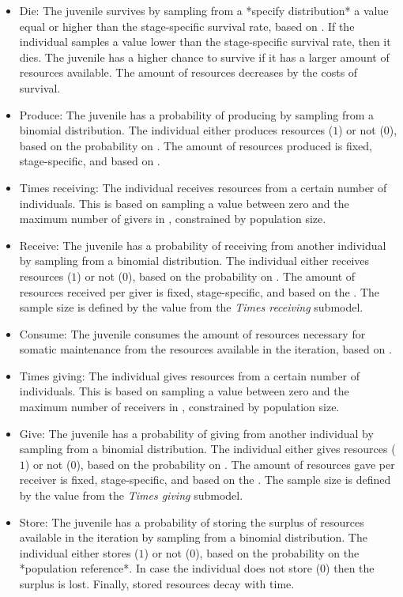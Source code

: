 \documentclass{article}
\begin{document}
\begin{itemize}
    \item Die: The juvenile survives by sampling from a *specify distribution* a value equal or higher than the stage-specific survival rate, based on \cite{gurven2007longevity}. If the individual samples a value lower than the stage-specific survival rate, then it dies. The juvenile has a higher chance to survive if it has a larger amount of resources available. The amount of resources decreases by the costs of survival.
    \item Produce: The juvenile has a probability of producing by sampling from a binomial distribution. The individual either produces resources ($1$) or not ($0$), based on the probability on \cite{koster2020life}. The amount of resources produced is fixed, stage-specific, and based on \cite{koster2020life}.
    \item Times receiving: The individual receives resources from a certain number of individuals. This is based on sampling a value between zero and the maximum number of givers in \cite{gurven2004give}, constrained by population size.
    \item Receive: The juvenile has a probability of receiving from another individual by sampling from a binomial distribution. The individual either receives resources ($1$) or not ($0$), based on the probability on \cite{gurven2004give}. The amount of resources received per giver is fixed, stage-specific, and based on the \cite{gurven2004give}. The sample size is defined by the value from the \emph{Times receiving} submodel. 
    \item Consume: The juvenile consumes the amount of resources necessary for somatic maintenance from the resources available in the iteration, based on \cite{kaplan2000theory}.
    \item Times giving: The individual gives resources from a certain number of individuals. This is based on sampling a value between zero and the maximum number of receivers in \cite{gurven2004give}, constrained by population size.
    \item Give: The juvenile has a probability of giving from another individual by sampling from a binomial distribution. The individual either gives resources ($1$) or not ($0$), based on the probability on \cite{gurven2004give}. The amount of resources gave per receiver is fixed, stage-specific, and based on the \cite{gurven2004give}. The sample size is defined by the value from the \emph{Times giving} submodel. 
    \item Store: The juvenile has a probability of storing the surplus of resources available in the iteration by sampling from a binomial distribution. The individual either stores ($1$) or not ($0$), based on the probability on the *population reference*. In case the individual does not store ($0$) then the surplus is lost. Finally, stored resources decay with time.

\end{itemize}
\end{document}
